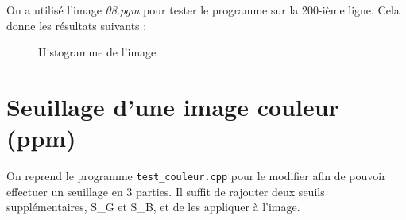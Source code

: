 \documentclass[french,a4paper,10pt]{article}
\begin{document}
	On a utilis\'e l'image \emph{08.pgm} pour tester le programme sur la 200-ième ligne.
	Cela donne les r\'esultats suivants :
	\begin{figure}[!htb]
		\begin{minipage}{0.48\textwidth}
			\centering
			\caption{Donn\'ees de l'histogramme}\label{Fig:profil-data}
		\end{minipage}\hfill
		\begin{minipage}{0.48\textwidth}
			\centering
			\caption{Histogramme de l'image}\label{Fig:profil-plot}
		\end{minipage}
	\end{figure}

	\newpage
	\section{Seuillage d'une image couleur (ppm)}\label{sec:5}
	On reprend le programme \texttt{test\_couleur.cpp} pour le modifier afin de pouvoir effectuer un seuillage en 3
	parties.
	Il suffit de rajouter deux seuils supplémentaires, S\_G et S\_B, et de les appliquer à l'image.
\end{document}
